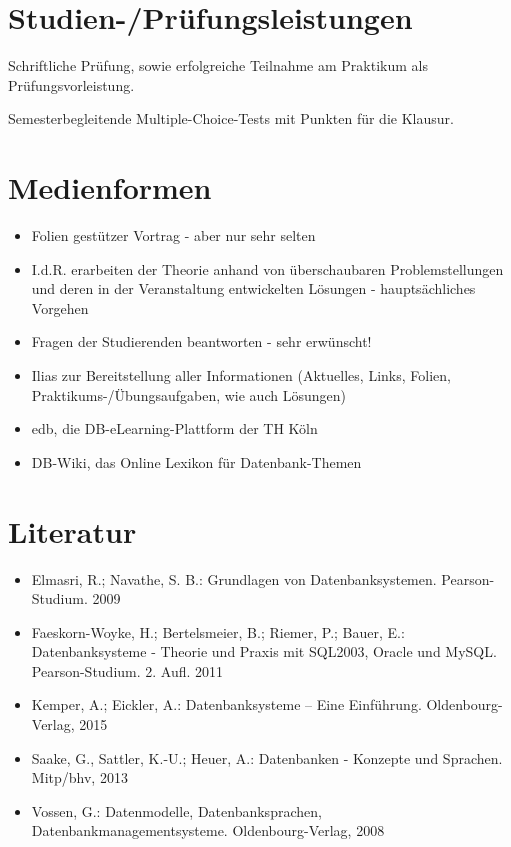\section*{Studien-/Prüfungsleistungen\label{/mi-2017/modulbeschreibungen-bachelor/BA_Datenbanken1}}\label{studien-pruxfcfungsleistungenpathlabelmi-2017modulbeschreibungen-bachelorbaux5fdatenbanken1}

Schriftliche Prüfung, sowie erfolgreiche Teilnahme am Praktikum als
Prüfungsvorleistung.

Semesterbegleitende Multiple-Choice-Tests mit Punkten für die Klausur.

\section*{Medienformen\label{/mi-2017/modulbeschreibungen-bachelor/BA_Datenbanken1}}\label{medienformenpathlabelmi-2017modulbeschreibungen-bachelorbaux5fdatenbanken1}

\begin{itemize}
\tightlist
\item
  Folien gestützer Vortrag - aber nur sehr selten
\item
  I.d.R. erarbeiten der Theorie anhand von überschaubaren
  Problemstellungen und deren in der Veranstaltung entwickelten Lösungen
  - hauptsächliches Vorgehen
\item
  Fragen der Studierenden beantworten - sehr erwünscht!
\item
  Ilias zur Bereitstellung aller Informationen (Aktuelles, Links,
  Folien, Praktikums-/Übungsaufgaben, wie auch Lösungen)
\item
  edb, die DB-eLearning-Plattform der TH Köln
\item
  DB-Wiki, das Online Lexikon für Datenbank-Themen
\end{itemize}

\section*{Literatur\label{/mi-2017/modulbeschreibungen-bachelor/BA_Datenbanken1}}\label{literaturpathlabelmi-2017modulbeschreibungen-bachelorbaux5fdatenbanken1}

\begin{itemize}
\tightlist
\item
  Elmasri, R.; Navathe, S. B.: Grundlagen von Datenbanksystemen.
  Pearson-Studium. 2009
\item
  Faeskorn-Woyke, H.; Bertelsmeier, B.; Riemer, P.; Bauer, E.:
  Datenbanksysteme - Theorie und Praxis mit SQL2003, Oracle und MySQL.
  Pearson-Studium. 2. Aufl. 2011
\item
  Kemper, A.; Eickler, A.: Datenbanksysteme -- Eine Einführung.
  Oldenbourg-Verlag, 2015
\item
  Saake, G., Sattler, K.-U.; Heuer, A.: Datenbanken - Konzepte und
  Sprachen. Mitp/bhv, 2013
\item
  Vossen, G.: Datenmodelle, Datenbanksprachen,
  Datenbankmanagementsysteme. Oldenbourg-Verlag, 2008
\end{itemize}

